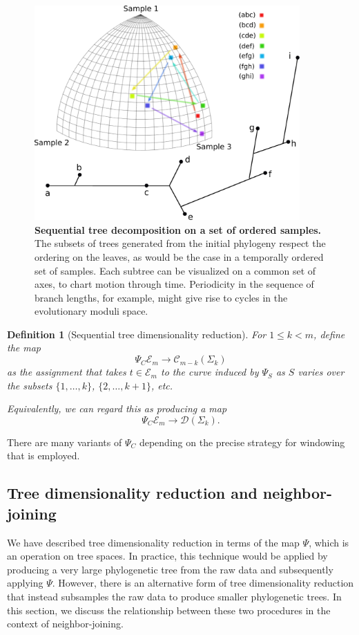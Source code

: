 \documentclass[a4paper,11pt]{article}
\newtheorem{definition}[theorem]{Definition}
\newcommand{\aC}{\mathcal{C}}
\newcommand{\aD}{\mathcal{D}}
\newcommand{\aE}{\mathcal{E}}
\begin{document}
\begin{figure}
    \centering
    \includegraphics[width=4in]{../figures/dimred_def4.pdf}
    \caption{{\bf Sequential tree decomposition on a set of ordered samples.} The subsets of trees generated from the initial phylogeny respect the ordering on the leaves, as would be the case in a temporally ordered set of samples. Each subtree can be visualized on a common set of axes, to chart motion through time. Periodicity in the sequence of branch lengths, for example, might give rise to cycles in the evolutionary moduli space.}
    \label{fig:dimred_def4}
\end{figure} 

\begin{definition}[Sequential tree dimensionality reduction]
For $1 \leq k < m$, define the map
\[
\Psi_C \aE_m \to \aC_{m-k}(\Sigma_k)
\]
as the assignment that takes $t \in \aE_m$ to the curve induced by $\Psi_S$ as $S$ varies over the subsets $\{1, \ldots, k\}$, $\{2, \ldots, k+1\}$, etc.

Equivalently, we can regard this as producing a map
\[
\Psi_C \aE_m \to \aD(\Sigma_k).
\]
\end{definition}

There are many variants of $\Psi_C$ depending on the precise strategy for windowing that is employed.

\subsection{Tree dimensionality reduction and neighbor-joining}

We have described tree dimensionality reduction in terms of the map $\Psi$, which is an operation on tree spaces.
In practice, this technique would be applied by producing a very large phylogenetic tree from the raw data and subsequently applying $\Psi$.
However, there is an alternative form of tree dimensionality reduction that instead subsamples the raw data to produce smaller phylogenetic trees.
In this section, we discuss the relationship between these two procedures in the context of neighbor-joining.
\end{document}
